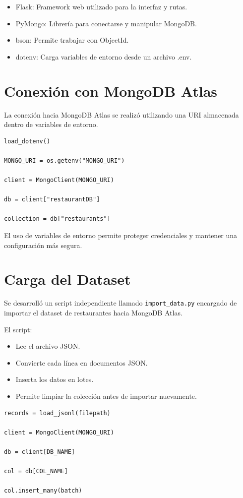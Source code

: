 \documentclass[12pt]{article}
\begin{document}
\begin{itemize}
    \item Flask: Framework web utilizado para la interfaz y rutas.
    \item PyMongo: Librería para conectarse y manipular MongoDB.
    \item bson: Permite trabajar con ObjectId.
    \item dotenv: Carga variables de entorno desde un archivo .env.
\end{itemize}


\section{Conexión con MongoDB Atlas}

La conexión hacia MongoDB Atlas se realizó utilizando una URI almacenada dentro de variables de entorno.

\begin{lstlisting}
load_dotenv()

MONGO_URI = os.getenv("MONGO_URI")

client = MongoClient(MONGO_URI)

db = client["restaurantDB"]

collection = db["restaurants"]
\end{lstlisting}

El uso de variables de entorno permite proteger credenciales y mantener una configuración más segura.


\section{Carga del Dataset}

Se desarrolló un script independiente llamado \texttt{import\_data.py} encargado de importar el dataset de restaurantes hacia MongoDB Atlas.

El script:

\begin{itemize}
    \item Lee el archivo JSON.
    \item Convierte cada línea en documentos JSON.
    \item Inserta los datos en lotes.
    \item Permite limpiar la colección antes de importar nuevamente.
\end{itemize}

\begin{lstlisting}
records = load_jsonl(filepath)

client = MongoClient(MONGO_URI)

db = client[DB_NAME]

col = db[COL_NAME]

col.insert_many(batch)
\end{lstlisting}
\end{document}
